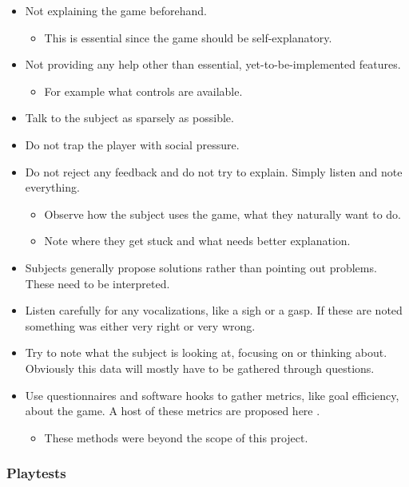 \begin{itemize}
\item Not explaining the game beforehand.
\begin{itemize}
\item This is essential since the game should be self-explanatory.
\end{itemize}

\item Not providing any help other than essential, yet-to-be-implemented features.
\begin{itemize}
\item For example what controls are available.
\end{itemize}

\item Talk to the subject as sparsely as possible.
\item Do not trap the player with social pressure.
\item Do not reject any feedback and do not try to explain. Simply
  listen and note everything.
\begin{itemize}
\item Observe how the subject uses the game, what they naturally want
  to do.
\item Note where they get stuck and what needs better explanation.
\end{itemize}


\item Subjects generally propose solutions rather than pointing out
  problems. These need to be interpreted.
\item Listen carefully for any vocalizations, like a sigh or a
  gasp. If these are noted something was either very right or very
  wrong.
\item Try to note what the subject is looking at, focusing on or
  thinking about. Obviously this data will mostly have to be gathered
  through questions.
\item Use questionnaires and software hooks to gather metrics, like
  goal efficiency, about the game. A host of these metrics are
  proposed here \cite{sanchez09}.
\begin{itemize}
\item These methods were beyond the scope of this project.
\end{itemize}

\end{itemize}

\subsubsection{Playtests}
\label{sec:playtests}


